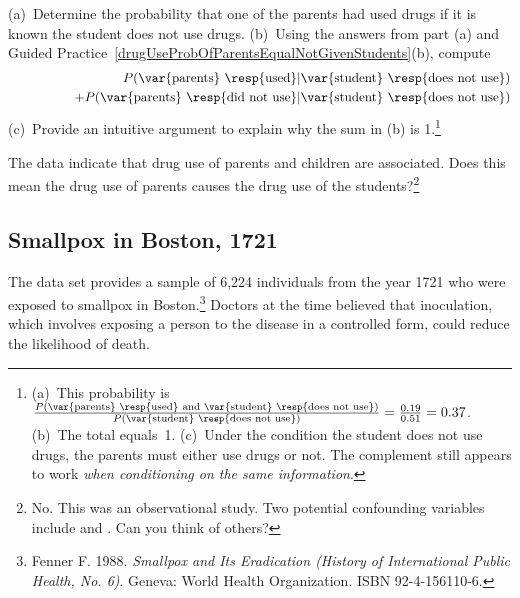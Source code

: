 \textPE{\pagebreak}

\begin{exercise}\label{whyCondProbSumTo1}
(a)~Determine the probability that one of the parents had used drugs if it is known the student does not use drugs.
(b)~Using the answers from part (a) and Guided Practice~\ref{drugUseProbOfParentsEqualNotGivenStudents}(b), compute \vspace{-1.5mm}
\begin{eqnarray*}
&&P(\text{\var{parents} \resp{used}}|\text{\var{student} \resp{does not use}})\\
&&	\quad \quad \quad \quad + P(\text{\var{parents} \resp{did not use}}|\text{\var{student} \resp{does not use}})
\end{eqnarray*}
(c)~Provide an intuitive argument to explain why the sum in (b) is 1.\footnote{(a)~This probability is $\frac{P(\text{\var{parents} \resp{used} and \var{student} \resp{does not use}})}{P(\text{\var{student} \resp{does not use}})} = \frac{0.19}{0.51} = 0.37$. (b)~The total equals~1. (c)~Under the condition the student does not use drugs, the parents must either use drugs or not. The complement still appears to work \emph{when conditioning on the same information}.}
\end{exercise}

\begin{exercise}
The data indicate that drug use of parents and children are associated. Does this mean the drug use of parents causes the drug use of the students?\footnote{No. This was an observational study. Two potential confounding variables include  and . Can you think of others?}
\end{exercise}

\subsection{Smallpox in Boston, 1721}


The  data set provides a sample of 6,224 individuals from the year 1721 who were exposed to smallpox in Boston.\footnote{Fenner F. 1988. \emph{Smallpox and Its Eradication (History of International Public Health, No. 6)}. Geneva: World Health Organization. ISBN 92-4-156110-6.} Doctors at the time believed that inoculation, which involves exposing a person to the disease in a controlled form, could reduce the likelihood of death.

